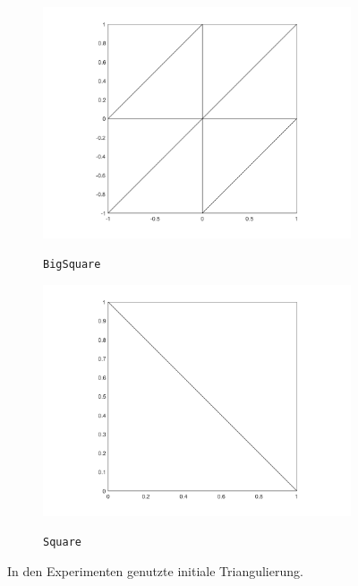 \begin{figure}[!ht]
  \centering
  \begin{subfigure}[b]{.48\linewidth}
    \caption{\texttt{BigSquare}}
    \includegraphics[trim = 90 30 90 20, clip, width=\linewidth]
      {pictures/chapExperiments/secGeneralInfo/bigSquareTriang.png}
    \label{fig:triangBigSquare}
  \end{subfigure}
  \quad
  \begin{subfigure}[b]{.48\linewidth}
    \caption{\texttt{Square}}
    \includegraphics[trim = 90 30 90 20, clip, width=\linewidth]
      {pictures/chapExperiments/secGeneralInfo/squareTriang.png}
    \label{fig:triangSquare}
  \end{subfigure}
  \caption{In den Experimenten genutzte initiale Triangulierung.}
  \label{fig:initialTriangulations}
\end{figure}

